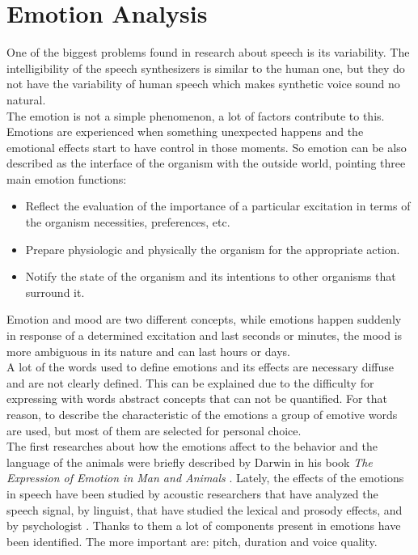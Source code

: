\section{Emotion Analysis}\label{emotana}
One of the biggest problems found in research about speech is its variability. The intelligibility of the speech synthesizers is similar to the human one, but they do not have the variability of human speech which makes synthetic voice sound no natural.\\
The emotion is not a simple phenomenon, a lot of factors contribute to this.\\
Emotions are experienced when something unexpected happens and the emotional effects start to have control in those moments. So emotion can be also described as the interface of the organism with the outside world, pointing three main emotion functions:
\begin{itemize}
 \item Reflect the evaluation of the importance of a particular excitation in terms of the organism necessities, preferences, etc.
 \item Prepare physiologic and physically the organism for the appropriate action.
 \item Notify the state of the organism and its intentions to other organisms that surround it.
\end{itemize}
Emotion and mood are two different concepts, while emotions happen suddenly in response of a determined excitation and last seconds or minutes, the mood is more ambiguous in its nature and can last hours or days.\\
A lot of the words used to define emotions and its effects are necessary diffuse and are not clearly defined. This can be explained due to the difficulty for expressing with words abstract concepts that can not be quantified. For that reason, to describe the characteristic  of the emotions a group of emotive words are used, but most of them are selected for personal choice.\\
The first researches about how the emotions affect to the behavior and the language of the animals were briefly described by Darwin in his book \textit{The Expression of Emotion in Man and Animals} \cite{darwin}. Lately, the effects of the emotions in speech have been studied by acoustic researchers that have analyzed the speech signal, by linguist, that have studied the lexical and prosody effects, and by psychologist . Thanks to them a lot of components present in emotions have been identified. The more important are: pitch, duration and voice quality.\\
